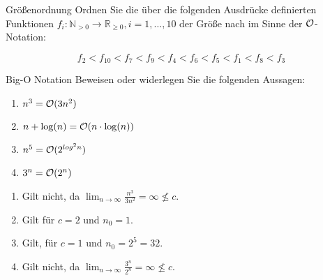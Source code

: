 \documentclass{article}
\begin{document}
\begin{exercise}{Größenordnung}
  Ordnen Sie die über die folgenden Ausdrücke definierten Funktionen $f_i : \mathbb{N}_{>0} \rightarrow \mathbb{R}_{\geq 0}, i = 1, \ldots, 10$ der Größe nach im Sinne der $\mathcal{O}$-Notation:
  

  \begin{solution}
    \begin{equation*}
      f_2 < f_{10} < f_7 < f_9 < f_4 < f_6 < f_5 < f_1 < f_8 < f_3
    \end{equation*}
  \end{solution}
\end{exercise}

\begin{exercise}{Big-O Notation}
  Beweisen oder widerlegen Sie die folgenden Aussagen:
  \begin{enumerate}
    \item $n^3 = \mathcal{O}(3n^2)$
    \item $n + \log(n) = \mathcal{O}(n \cdot \log(n))$
    \item $n^5 = \mathcal{O}(2^{log^2{n}})$
    \item $3^n = \mathcal{O}(2^n)$
  \end{enumerate}

  \begin{solution}
    \begin{enumerate}
      \item Gilt nicht, da $\lim_{n\to\infty} \frac{n^3}{3n^2} = \infty \not\le c$.
      \item Gilt für $c = 2$ und $n_0 = 1$.
      \item Gilt, für $c = 1$ und $n_0 = 2^5 = 32$.
      \item Gilt nicht, da $\lim_{n\to\infty} \frac{3^n}{2^n} = \infty \not\le c$.
    \end{enumerate}
  \end{solution}
\end{exercise}
\end{document}
